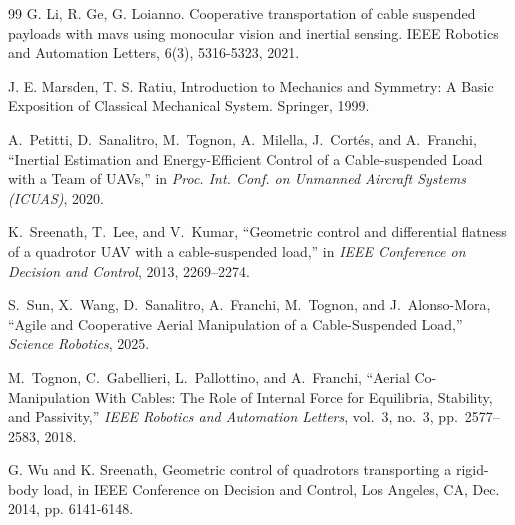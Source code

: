 \documentclass[letterpaper, 10 pt, conference]{ieeeconf}  %
\begin{document}
\begin{thebibliography}{99}
 G. Li, R. Ge, G. Loianno. Cooperative transportation of cable suspended payloads with mavs using monocular vision and inertial sensing. IEEE Robotics and Automation Letters, 6(3), 5316-5323, 2021.

 J. E. Marsden, T. S. Ratiu, Introduction to Mechanics and Symmetry: A Basic Exposition of Classical Mechanical System. Springer, 1999. 


A.~Petitti, D.~Sanalitro, M.~Tognon, A.~Milella, J.~Cort\'es, and A.~Franchi,
``Inertial Estimation and Energy-Efficient Control of a Cable-suspended Load with a Team of UAVs,''
in \emph{Proc. Int. Conf. on Unmanned Aircraft Systems (ICUAS)},
2020.

K.~Sreenath, T.~Lee, and V.~Kumar, ``Geometric control and differential
  flatness of a quadrotor {UAV} with a cable-suspended load,'' in
  \textit{IEEE Conference on Decision and Control}, 2013,
  2269--2274.

S.~Sun, X.~Wang, D.~Sanalitro, A.~Franchi, M.~Tognon, and J.~Alonso-Mora,
``Agile and Cooperative Aerial Manipulation of a Cable-Suspended Load,''
\emph{Science Robotics}, 2025.




M.~Tognon, C.~Gabellieri, L.~Pallottino, and A.~Franchi,
``Aerial Co-Manipulation With Cables: The Role of Internal Force for Equilibria, Stability, and Passivity,''
\emph{IEEE Robotics and Automation Letters},
vol.~3, no.~3, pp.~2577--2583, 2018.



 G. Wu and K. Sreenath, Geometric control of quadrotors transporting a rigid-body load, in IEEE Conference on Decision and Control, Los Angeles, CA, Dec. 2014, pp. 6141-6148.
\end{thebibliography}
\end{document}
